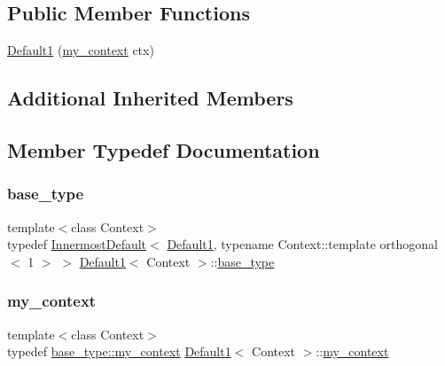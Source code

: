 \subsection*{Public Member Functions}
\begin{DoxyCompactItemize}
\item 
\mbox{\hyperlink{struct_default1_ab8f12bb5672dacc6a41df3000d9c19de}{Default1}} (\mbox{\hyperlink{struct_default1_a92f8ed76bf3688622a87155b17e4fccf}{my\+\_\+context}} ctx)
\end{DoxyCompactItemize}
\subsection*{Additional Inherited Members}


\subsection{Member Typedef Documentation}
\mbox{\label{struct_default1_a763f778f35926579e387cf8e145542ba}} 
\subsubsection{\texorpdfstring{base\+\_\+type}{base\_type}}
{\footnotesize\ttfamily template$<$class Context$>$ \\
typedef \mbox{\hyperlink{struct_innermost_default}{Innermost\+Default}}$<$ \mbox{\hyperlink{struct_default1}{Default1}}, typename Context\+::template orthogonal$<$ 1 $>$ $>$ \mbox{\hyperlink{struct_default1}{Default1}}$<$ Context $>$\+::\mbox{\hyperlink{struct_default1_a763f778f35926579e387cf8e145542ba}{base\+\_\+type}}}

\mbox{\label{struct_default1_a92f8ed76bf3688622a87155b17e4fccf}} 
\subsubsection{\texorpdfstring{my\+\_\+context}{my\_context}}
{\footnotesize\ttfamily template$<$class Context$>$ \\
typedef \mbox{\hyperlink{struct_innermost_default_a0aab337364dec3101e80f293b709d53d}{base\+\_\+type\+::my\+\_\+context}} \mbox{\hyperlink{struct_default1}{Default1}}$<$ Context $>$\+::\mbox{\hyperlink{struct_default1_a92f8ed76bf3688622a87155b17e4fccf}{my\+\_\+context}}}



